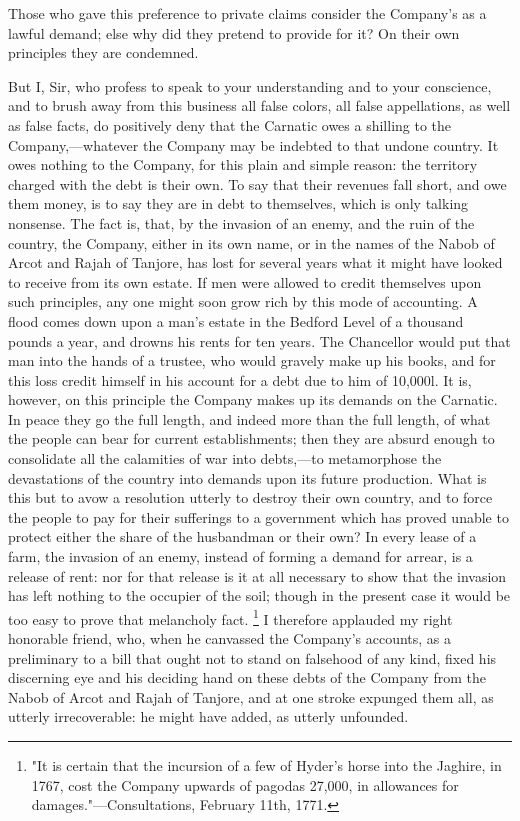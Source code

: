 Those who gave this preference to private claims consider the Company's as a lawful demand; else why did they pretend to provide for it? On their own principles they are condemned.

But I, Sir, who profess to speak to your understanding and to your conscience, and to brush away from this business all false colors, all false appellations, as well as false facts, do positively deny that the Carnatic owes a shilling to the Company,—whatever the Company may be indebted to that undone country. It owes nothing to the Company, for this plain and simple reason: the territory charged with the debt is their own. To say that their revenues fall short, and owe them money, is to say they are in debt to themselves, which is only talking nonsense. The fact is, that, by the invasion of an enemy, and the ruin of the country, the Company, either in its own name, or in the names of the Nabob of Arcot and Rajah of Tanjore, has lost for several years what it might have looked to receive from its own estate. If men were allowed to credit themselves upon such principles, any one might soon grow rich by this mode of accounting. A flood comes down upon a man's estate in the Bedford Level of a thousand pounds a year, and drowns his rents for ten years. The Chancellor would put that man into the hands of a trustee, who would gravely make up his books, and for this loss credit himself in his account for a debt due to him of 10,000l. It is, however, on this principle the Company makes up its demands on the Carnatic. In peace they go the full length, and indeed more than the full length, of what the people can bear for current establishments; then they are absurd enough to consolidate all the calamities of war into debts,—to metamorphose the devastations of the country into demands upon its future production. What is this but to avow a resolution utterly to destroy their own country, and to force the people to pay for their sufferings to a government which has proved unable to protect either the share of the husbandman or their own? In every lease of a farm, the invasion of an enemy, instead of forming a demand for arrear, is a release of rent: nor for that release is it at all necessary to show that the invasion has left nothing to the occupier of the soil; though in the present case it would be too easy to prove that melancholy fact.
\footnote{ "It is certain that the incursion of a few of Hyder's horse into the Jaghire, in 1767, cost the Company upwards of pagodas 27,000, in allowances for damages."—Consultations, February 11th, 1771.}
 I therefore applauded my right honorable friend, who, when he canvassed the Company's accounts, as a preliminary to a bill that ought not to stand on falsehood of any kind, fixed his discerning eye and his deciding hand on these debts of the Company from the Nabob of Arcot and Rajah of Tanjore, and at one stroke expunged them all, as utterly irrecoverable: he might have added, as utterly unfounded.

